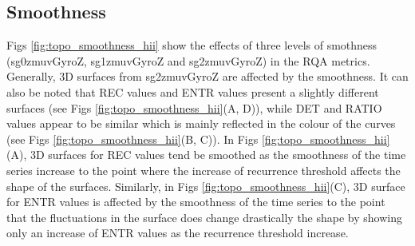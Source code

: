 \subsection{Smoothness}
Figs \ref{fig:topo_smoothness_hii} show the effects of three levels of 
smothness (sg0zmuvGyroZ, sg1zmuvGyroZ and sg2zmuvGyroZ) in the RQA metrics.
Generally, 3D surfaces from sg2zmuvGyroZ are affected by the smoothness.
It can also be noted that REC values and ENTR values present a slightly 
different surfaces (see Figs \ref{fig:topo_smoothness_hii}(A, D)), 
while DET and RATIO values appear to be similar which is mainly reflected in 
the colour of the curves (see Figs \ref{fig:topo_smoothness_hii}(B, C)).
In Figs \ref{fig:topo_smoothness_hii}(A), 3D surfaces for REC values tend be 
smoothed as the smoothness of the time series increase to the point where 
the increase of recurrence threshold affects the shape of the surfaces.
Similarly, in Figs  \ref{fig:topo_smoothness_hii}(C), 
3D surface for ENTR values is affected by the smoothness of the 
time series to the point that the fluctuations in the surface does change 
drastically the shape by showing only an increase of ENTR values as
the recurrence threshold increase.


